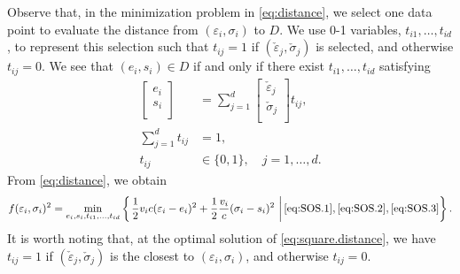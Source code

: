 \documentclass[a4paper,11pt]{scrartcl}
\theoremstyle{plain}
\theoremstyle{definition}
\theoremstyle{remark}
\begin{document}
Observe that, in the minimization problem in \eqref{eq:distance}, 
we select one data point to evaluate the distance from 
$(\varepsilon_{i},\sigma_{i})$ to $D$. 
We use 0-1 variables, $t_{i1},\dots,t_{id}$, to represent this selection 
such that $t_{ij}=1$ if 
$(\check{\varepsilon}_{j},\check{\sigma}_{j})$ is selected, and 
otherwise $t_{ij}=0$. 
We see that $(e_{i},s_{i}) \in D$ if and only if there exist 
$t_{i1},\dots,t_{id}$ satisfying 
\begin{align}
  \begin{bmatrix}
    e_{i} \\ s_{i} \\
  \end{bmatrix}
  &= \sum_{j=1}^{d} 
  \begin{bmatrix}
    \check{\varepsilon}_{j} \\
    \check{\sigma}_{j} \\
  \end{bmatrix}
  t_{ij} , 
  \label{eq:SOS.1} \\
  \sum_{j=1}^{d} t_{ij} &= 1 , 
  \label{eq:SOS.2} \\
  t_{ij} & \in \{ 0,1 \} , 
  \quad  j=1,\dots,d . 
  \label{eq:SOS.3}
\end{align}
From \eqref{eq:distance}, we obtain 
\begin{align}
  f(\varepsilon_{i},\sigma_{i})^{2} 
  = \min_{e_{i},s_{i},t_{i1},\dots,t_{id}} \left\{\left.
  \frac{1}{2} v_{i} c (\varepsilon_{i} - e_{i})^{2} 
  + \frac{1}{2} \frac{v_{i}}{c} (\sigma_{i} - s_{i})^{2} 
  \ \right|
  \eqref{eq:SOS.1}, \eqref{eq:SOS.2} , \eqref{eq:SOS.3}
  \right\} . 
  \label{eq:square.distance}
\end{align}
It is worth noting that, at the optimal solution of 
\eqref{eq:square.distance}, we have 
$t_{ij}=1$ if $(\check{\varepsilon}_{j},\check{\sigma}_{j})$ is 
the closest to $(\varepsilon_{i},\sigma_{i})$, 
and otherwise $t_{ij}=0$. 
\end{document}
